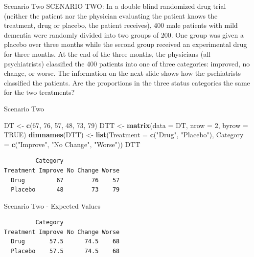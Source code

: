 \documentclass[
  ignorenonframetext,
]{beamer}
\newenvironment{Shaded}{\begin{snugshade}}{\end{snugshade}}
\newcommand{\AttributeTok}[1]{\textcolor[rgb]{0.13,0.29,0.53}{#1}}
\newcommand{\ConstantTok}[1]{\textcolor[rgb]{0.56,0.35,0.01}{#1}}
\newcommand{\DecValTok}[1]{\textcolor[rgb]{0.00,0.00,0.81}{#1}}
\newcommand{\FunctionTok}[1]{\textcolor[rgb]{0.13,0.29,0.53}{\textbf{#1}}}
\newcommand{\NormalTok}[1]{#1}
\newcommand{\OtherTok}[1]{\textcolor[rgb]{0.56,0.35,0.01}{#1}}
\newcommand{\SpecialCharTok}[1]{\textcolor[rgb]{0.81,0.36,0.00}{\textbf{#1}}}
\newcommand{\StringTok}[1]{\textcolor[rgb]{0.31,0.60,0.02}{#1}}
\begin{document}
\begin{frame}{Scenario Two}
\label{scenario-two}
SCENARIO TWO: In a double blind randomized drug trial (neither the
patient nor the physician evaluating the patient knows the treatment,
drug or placebo, the patient receives), 400 male patients with mild
dementia were randomly divided into two groups of 200. One group was
given a placebo over three months while the second group received an
experimental drug for three months. At the end of the three months, the
physicians (all psychiatrists) classified the 400 patients into one of
three categories: improved, no change, or worse. The information on the
next slide shows how the pschiatrists classified the patients. Are the
proportions in the three status categories the same for the two
treatments?
\end{frame}

\begin{frame}[fragile]{Scenario Two}
\label{scenario-two-1}
\begin{Shaded}
\begin{Highlighting}[]
\NormalTok{DT }\OtherTok{\textless{}{-}} \FunctionTok{c}\NormalTok{(}\DecValTok{67}\NormalTok{, }\DecValTok{76}\NormalTok{, }\DecValTok{57}\NormalTok{, }\DecValTok{48}\NormalTok{, }\DecValTok{73}\NormalTok{, }\DecValTok{79}\NormalTok{)}
\NormalTok{DTT }\OtherTok{\textless{}{-}} \FunctionTok{matrix}\NormalTok{(}\AttributeTok{data =}\NormalTok{ DT, }\AttributeTok{nrow =} \DecValTok{2}\NormalTok{, }\AttributeTok{byrow =} \ConstantTok{TRUE}\NormalTok{)}
\FunctionTok{dimnames}\NormalTok{(DTT) }\OtherTok{\textless{}{-}} \FunctionTok{list}\NormalTok{(}\AttributeTok{Treatment =} \FunctionTok{c}\NormalTok{(}\StringTok{"Drug"}\NormalTok{, }\StringTok{"Placebo"}\NormalTok{),}
   \AttributeTok{Category =} \FunctionTok{c}\NormalTok{(}\StringTok{"Improve"}\NormalTok{, }\StringTok{"No Change"}\NormalTok{, }\StringTok{"Worse"}\NormalTok{))}
\NormalTok{DTT}
\end{Highlighting}
\end{Shaded}

\begin{verbatim}
         Category
Treatment Improve No Change Worse
  Drug         67        76    57
  Placebo      48        73    79
\end{verbatim}
\end{frame}

\begin{frame}[fragile]{Scenario Two - Expected Values}
\label{scenario-two---expected-values}
\begin{Shaded}
\end{Shaded}

\begin{verbatim}
         Category
Treatment Improve No Change Worse
  Drug       57.5      74.5    68
  Placebo    57.5      74.5    68
\end{verbatim}
\end{frame}
\end{document}
